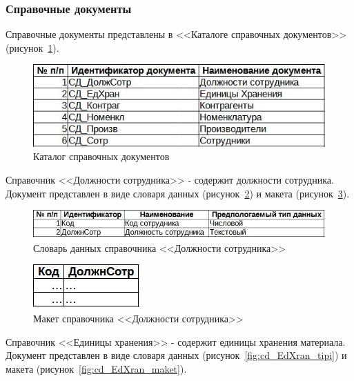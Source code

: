 \documentclass[12pt, a4paper, simple]{eskdtext}
\begin{document}
    \subsubsection{Справочные документы}

    Справочные документы представлены в <<Каталоге справочных документов>> (рисунок~\ref{fig:docs}).
    \begin{figure}[!h]
        \centering
        \includegraphics[]
            {_docs/docs.jpg}
        \caption{Каталог справочных документов}
        \label{fig:docs}
    \end{figure}

    Справочник <<Должности сотрудника>> - содержит должности сотрудника.
    Документ представлен в виде словаря данных (рисунок~\ref{fig:cd_DoljnCotr_tipi})
    и макета (рисунок~\ref{fig:cd_DoljnCotr_maket}).

    \begin{figure}[p!]
        \centering
        \includegraphics[]
            {_docs/СД_ДолжнСотр_типы.jpg}
        \caption{Словарь данных справочника <<Должности сотрудника>>}
        \label{fig:cd_DoljnCotr_tipi}
    \end{figure}

    \begin{figure}[p!]
        \centering
        \includegraphics[]
            {_docs/СД_ДолжнСотр_макет.jpg}
        \caption{Макет справочника <<Должности сотрудника>>}
        \label{fig:cd_DoljnCotr_maket}
    \end{figure}

    Справочник <<Единицы хранения>> - содержит единицы хранения материала.
    Документ представлен в виде словаря данных (рисунок~\ref{fig:cd_EdXran_tipi})
    и макета (рисунок~\ref{fig:cd_EdXran_maket}).
\end{document}
